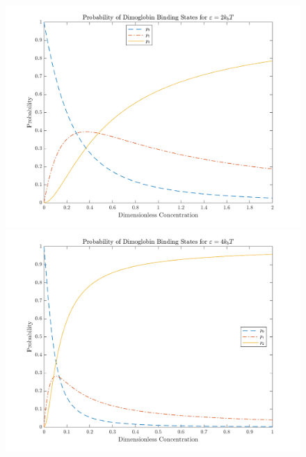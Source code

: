 \begin{figure}[h!]
\centering
\includegraphics[height=0.48\textheight]{PHYS319_HW3_Q2_FIG2.png}
\includegraphics[height=0.48\textheight]{PHYS319_HW3_Q2_FIG4.png}
\end{figure}
